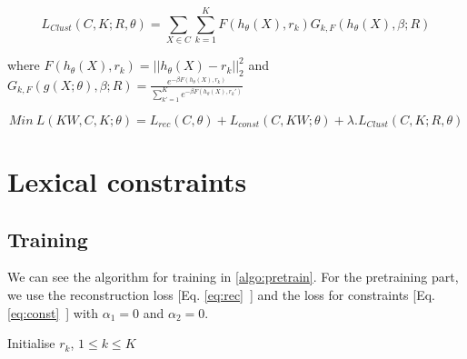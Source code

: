 \documentclass[a4paper]{article}
\begin{document}
\begin{equation}\label{eq:loss_clust}
  L_{Clust}(C, K;R, \theta) = \sum_{X \in C}\sum_{k=1}^K F(h_\theta(X), r_k) G_{k, F}(h_\theta(X), \beta; R) 
\end{equation}

where $F(h_\theta(X), r_k)=||h_\theta(X) - r_k||_2^2$ and $G_{k, F}(g(X; \theta), \beta; R) = \frac{e^{-\beta F(h_\theta(X),r_k)}}
{\sum_{k' = 1}^K e^{-\beta F(h_\theta(X),r_k')}}$

\begin{equation}\label{eq:loss_FINALE}
  Min~L(KW, C, K; \theta) = L_{rec}(C, \theta) + L_{const}(C,KW;\theta) + \lambda.L_{Clust}(C, K;R, \theta)
\end{equation}
\newpage
\section{Lexical constraints}
\subsection{Training}
We can see the algorithm for training in \ref{algo:pretrain}. For the pretraining part, we use
the reconstruction loss [Eq. \ref{eq:rec}~] and the loss for constraints [Eq. \ref{eq:const}~]
with $\alpha_1 =0$ and $\alpha_2 =0$.
\begin{algorithm}[!h]
  Initialise $r_k$, $1 \leq k \leq K$\\
\end{algorithm}
\end{document}
